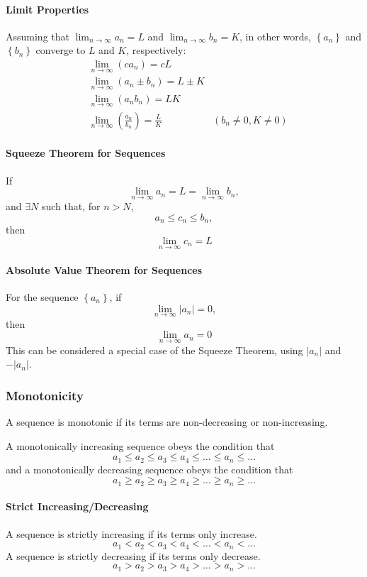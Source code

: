 \documentclass{article}
\begin{document}
\paragraph{Limit Properties} Assuming that \(\lim_{n \to \infty} a_n = L\) and  \(\lim_{n \to \infty} b_n = K\), in other words, $\left\{ a_n \right\}$ and $\left\{ b_n \right\}$ converge to $L$ and $K$, respectively:
\begin{align*}
    &\lim_{n \to \infty}\left( ca_n \right) = cL  \\
    &\lim_{n \to \infty}\left( a_n \pm b_n \right) = L \pm K  \\
    &\lim_{n \to \infty}\left( a_n b_n \right) = LK  \\
    &\lim_{n \to \infty}\left( \frac{a_n}{b_n} \right) = \frac{L}{K} & \left( b_n \ne 0, K \ne 0 \right)
\end{align*}

\paragraph{Squeeze Theorem for Sequences}
If $$\lim_{n \to \infty} a_n = L = \lim_{n \to \infty} b_n,$$ and $\exists N$ such that, for $n > N$, $$a_n \le c_n \le b_n,$$ then $$\lim_{n \to \infty} c_n = L$$

\paragraph{Absolute Value Theorem for Sequences}
For the sequence $\left\{ a_n \right\}$, if $$\lim_{n \to \infty} |a_n| = 0,$$ then $$\lim_{n \to \infty} a_n = 0$$
This can be considered a special case of the Squeeze Theorem, using $|a_n|$ and $-|a_n|$.

\subsubsection{Monotonicity}
A sequence is monotonic if its terms are non-decreasing or non-increasing.

A monotonically increasing sequence obeys the condition that
$$a_1 \le a_2 \le a_3 \le a_4 \le \ldots \le a_n \le \ldots$$
and a monotonically decreasing sequence obeys the condition that
$$a_1 \ge a_2 \ge a_3 \ge a_4 \ge \ldots \ge a_n \ge \ldots$$

\paragraph{Strict Increasing/Decreasing}
A sequence is strictly increasing if its terms only increase.
$$a_1 < a_2 < a_3 < a_4 < \ldots < a_n < \ldots$$
A sequence is strictly decreasing if its terms only decrease.
$$a_1 > a_2 > a_3 > a_4 > \ldots > a_n > \ldots$$
\end{document}
